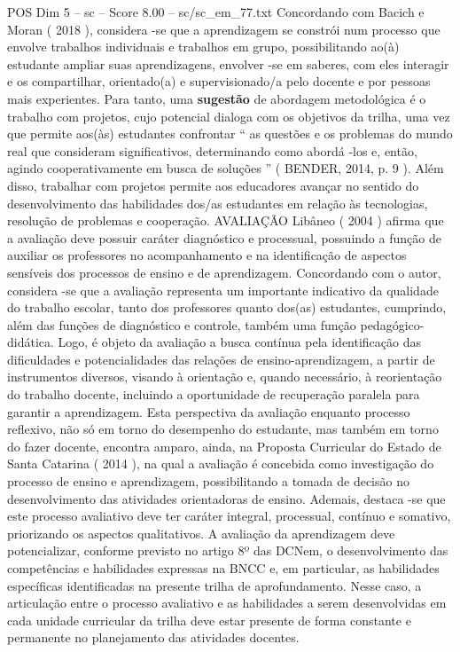 \begin{textsample}{POS Dim 5 – sc – Score 8.00 – sc/sc\_em\_77.txt}
Concordando com Bacich e Moran ( 2018 ), considera -se que a aprendizagem se constrói num processo que envolve trabalhos individuais e trabalhos em grupo, possibilitando ao(à) estudante ampliar suas aprendizagens, envolver -se em saberes, com eles interagir e os compartilhar, orientado(a) e supervisionado/a pelo docente e por pessoas mais experientes.
Para tanto, uma \textbf{sugestão} de abordagem metodológica é o trabalho com projetos, cujo potencial dialoga com os objetivos da trilha, uma vez que permite aos(às) estudantes confrontar “ as questões e os problemas do mundo real que consideram significativos, determinando como abordá -los e, então, agindo cooperativamente em busca de soluções ” ( BENDER, 2014, p. 9 ).
Além disso, trabalhar com projetos permite aos educadores avançar no sentido do desenvolvimento das habilidades dos/as estudantes em relação às tecnologias, resolução de problemas e cooperação.
AVALIAÇÃO Libâneo ( 2004 ) afirma que a avaliação deve possuir caráter diagnóstico e processual, possuindo a função de auxiliar os professores no acompanhamento e na identificação de aspectos sensíveis dos processos de ensino e de aprendizagem.
Concordando com o autor, considera -se que a avaliação representa um importante indicativo da qualidade do trabalho escolar, tanto dos professores quanto dos(as) estudantes, cumprindo, além das funções de diagnóstico e controle, também uma função pedagógico-didática.
Logo, é objeto da avaliação a busca contínua pela identificação das dificuldades e potencialidades das relações de ensino-aprendizagem, a partir de instrumentos diversos, visando à orientação e, quando necessário, à reorientação do trabalho docente, incluindo a oportunidade de recuperação paralela para garantir a aprendizagem.
Esta perspectiva da avaliação enquanto processo reflexivo, não só em torno do desempenho do estudante, mas também em torno do fazer docente, encontra amparo, ainda, na Proposta Curricular do Estado de Santa Catarina ( 2014 ), na qual a avaliação é concebida como investigação do processo de ensino e aprendizagem, possibilitando a tomada de decisão no desenvolvimento das atividades orientadoras de ensino.
Ademais, destaca -se que este processo avaliativo deve ter caráter integral, processual, contínuo e somativo, priorizando os aspectos qualitativos.
A avaliação da aprendizagem deve potencializar, conforme previsto no artigo 8º das DCNem, o desenvolvimento das competências e habilidades expressas na BNCC e, em particular, as habilidades específicas identificadas na presente trilha de aprofundamento.
Nesse caso, a articulação entre o processo avaliativo e as habilidades a serem desenvolvidas em cada unidade curricular da trilha deve estar presente de forma constante e permanente no planejamento das atividades docentes.

\end{textsample}
